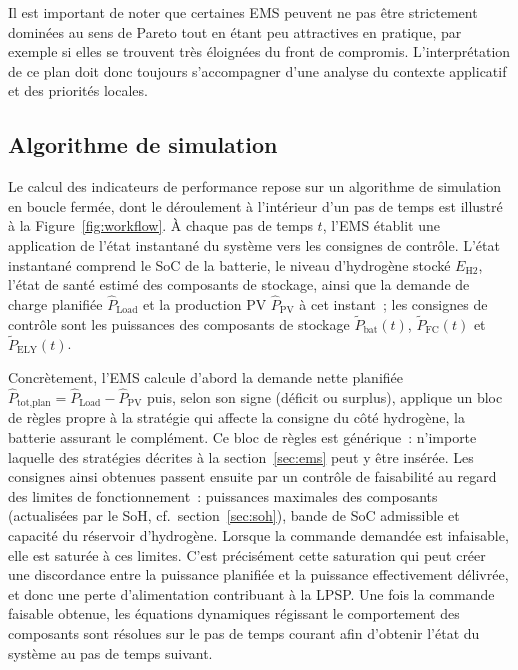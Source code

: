 Il est important de noter que certaines EMS peuvent ne pas être strictement dominées au sens de Pareto tout en étant peu attractives en pratique, par exemple si elles se trouvent très éloignées du front de compromis. L'interprétation de ce plan doit donc toujours s'accompagner d'une analyse du contexte applicatif et des priorités locales.

\subsection{Algorithme de simulation}

Le calcul des indicateurs de performance repose sur un algorithme de simulation en boucle fermée, dont le déroulement à l'intérieur d'un pas de temps est illustré à la Figure~\ref{fig:workflow}. À chaque pas de temps $t$, l'EMS établit une application de l'état instantané du système vers les consignes de contrôle. L'état instantané comprend le SoC de la batterie, le niveau d'hydrogène stocké $E_{\text{H2}}$, l'état de santé estimé des composants de stockage, ainsi que la demande de charge planifiée $\hat{P}_{\text{Load}}$ et la production PV $\hat{P}_{\text{PV}}$ à cet instant~; les consignes de contrôle sont les puissances des composants de stockage $\tilde{P}_{\text{bat}}(t)$, $\tilde{P}_{\text{FC}}(t)$ et $\tilde{P}_{\text{ELY}}(t)$.

Concrètement, l'EMS calcule d'abord la demande nette planifiée $\hat{P}_{\text{tot,plan}} = \hat{P}_{\text{Load}} - \hat{P}_{\text{PV}}$ puis, selon son signe (déficit ou surplus), applique un bloc de règles propre à la stratégie qui affecte la consigne du côté hydrogène, la batterie assurant le complément. Ce bloc de règles est générique~: n'importe laquelle des stratégies décrites à la section~\ref{sec:ems} peut y être insérée. Les consignes ainsi obtenues passent ensuite par un contrôle de faisabilité au regard des limites de fonctionnement~: puissances maximales des composants (actualisées par le SoH, cf.\ section~\ref{sec:soh}), bande de SoC admissible et capacité du réservoir d'hydrogène. Lorsque la commande demandée est infaisable, elle est saturée à ces limites. C'est précisément cette saturation qui peut créer une discordance entre la puissance planifiée et la puissance effectivement délivrée, et donc une perte d'alimentation contribuant à la LPSP. Une fois la commande faisable obtenue, les équations dynamiques régissant le comportement des composants sont résolues sur le pas de temps courant afin d'obtenir l'état du système au pas de temps suivant.

